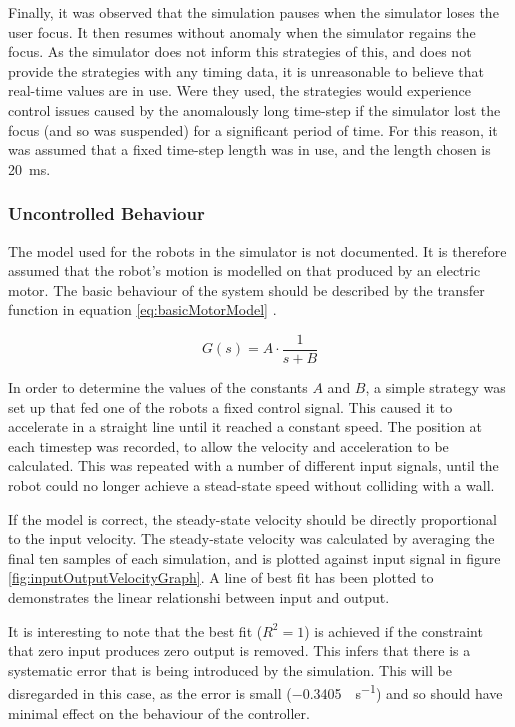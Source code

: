 \documentclass[10pt]{article} \usepackage[a4paper]{geometry}
\begin{document}
Finally, it was observed that the simulation pauses when the simulator loses the
user focus.  It then resumes without anomaly when the simulator regains the
focus.  As the simulator does not inform this strategies of this, and does not
provide the strategies with any timing data, it is unreasonable to believe that
real-time values are in use.  Were they used, the strategies would experience
control issues caused by the anomalously long time-step if the simulator lost
the focus (and so was suspended) for a significant period of time.  For this
reason, it was assumed that a fixed time-step length was in use, and the length
chosen is \SI{20}{\milli\second}.

\subsubsection{Uncontrolled Behaviour}

The model used for the robots in the simulator is not documented. It is
therefore assumed that the robot's motion is modelled on that produced by an
electric motor. The basic behaviour of the system should be described by the 
transfer function in equation \ref{eq:basicMotorModel} \cite{basicControlNotes}.

\begin{equation}
 \label{eq:basicMotorModel}
 G\left(s\right) = A \cdot \frac{1}{s+B}
\end{equation}

In order to determine the values of the constants $A$ and $B$, a simple strategy
was set up that fed one of the robots a fixed control signal.  This caused it to
accelerate in a straight line until it reached a constant speed.  The position
at each timestep was recorded, to allow the velocity and acceleration to be
calculated.  This was repeated with a number of different input signals, until
the robot could no longer achieve a stead-state speed without colliding with a
wall.

If the model is correct, the steady-state velocity should be directly
proportional to the input velocity.  The steady-state velocity was calculated by
averaging the final ten samples of each simulation, and is plotted against input
signal in figure \ref{fig:inputOutputVelocityGraph}.  A line of best fit has
been plotted to demonstrates the linear relationshi between input and output.

It is interesting to note that the best fit ($R^2 = 1$) is achieved if the
constraint that zero input produces zero output is removed.  This infers that
there is a systematic error that is being introduced by the simulation.  This
will be disregarded in this case, as the error is small
(\SI{-0.3405}{\inch\per\second}) and so should have minimal effect on the
behaviour of the controller.
\end{document}
